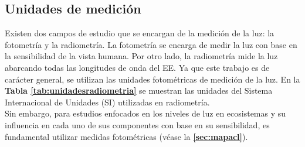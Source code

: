 \newpage

\subsection{Unidades de medición}

Existen dos campos de estudio que se encargan de la medición de la luz: la fotometría y la radiometría. La fotometría se encarga de medir la luz con base en la sensibilidad de la vista humana. Por otro lado, la radiometría mide la luz abarcando todas las longitudes de onda del EE. Ya que este trabajo es de carácter general, se utilizan las unidades fotométricas de medición de la luz. En la \textbf{Tabla \ref{tab:unidadesradiometria}} se muestran las unidades del Sistema Internacional de Unidades (SI) utilizadas en radiometría.\\

Sin embargo, para estudios enfocados en los niveles de luz en ecosistemas y su influencia en cada uno de sus componentes con base en su sensibilidad, es fundamental utilizar medidas fotométricas (véase la \textbf{\autoref{sec:mapacl}}).


\begin{table}[htb]
\centering
\caption{Unidades del SI utilizadas en radiometría \citep{Jurgen1968}}
\label{tab:unidadesradiometria}
\end{table}

